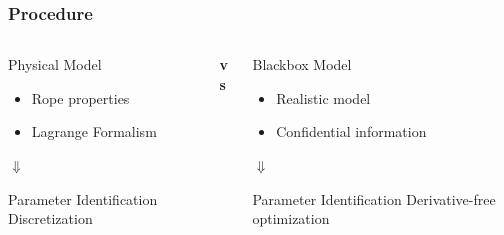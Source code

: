 \begin{frame}
    \frametitle{Procedure}
    \begin{columns}[onlytextwidth]
        \begin{column}{0.4\textwidth}
            \begin{block}{Physical Model}
                \begin{itemize}
                    \item{Rope properties}
                    \item{Lagrange Formalism}
                \end{itemize}
            \end{block}
            
            $\Downarrow$
            
            \begin{block}{Parameter Identification}
            Discretization
            \end{block}
        \end{column}
        
        
        \begin{column}{0.05\textwidth}
        \textbf{vs}
        \end{column}
        
        \begin{column}{0.4\textwidth}
            \begin{exampleblock}{Blackbox Model}
                \begin{itemize}
                    \item{Realistic model}
                    \item{Confidential information}
                \end{itemize}
            \end{exampleblock}
            
            $\Downarrow$
            
            \begin{exampleblock}{Parameter Identification}
            Derivative-free optimization
            \end{exampleblock}
        \end{column}
    \end{columns}
\end{frame}



